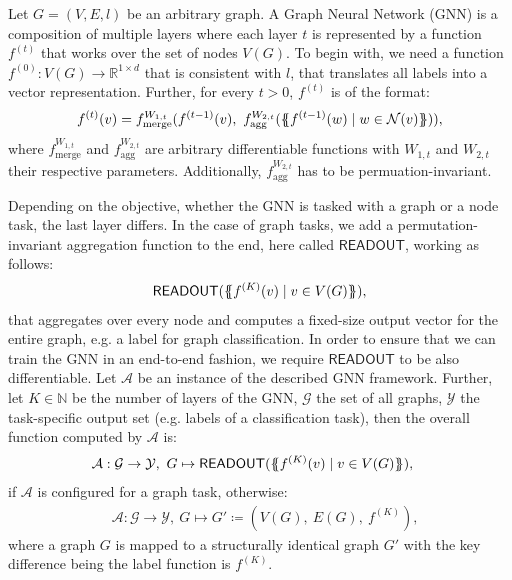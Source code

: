 \begin{definition}\label{def:gnn}
    Let $G = (V, E, l)$ be an arbitrary graph. A Graph Neural Network (GNN) is a composition of multiple layers where each layer $t$ is represented by a function $f^{(t)}$ that works over the set of nodes $V(G)$. To begin with, we need a function $f^{(0)}: V(G) \rightarrow \mathbb{R}^{1 \times d}$ that is consistent with $l$, that translates all labels into a vector representation. Further, for every $t > 0$, $f^{(t)}$ is of the format:
    \begin{align*}
    f^{(t)}(v) = f^{W_{1,t}}_{\text{merge}} (f^{(t-1)}(v), \  f^{W_{2,t}}_{\text{agg}}( \{\!\!\{ f^{(t-1)}(w) \mid w \in \mathcal{N}(v) \}\!\!\} )),
    \end{align*}
    where $f^{W_{1,t}}_{\text{merge}}$ and $f^{W_{2,t}}_{\text{agg}}$ are arbitrary differentiable functions with $W_{1,t}$ and $W_{2,t}$ their respective parameters. Additionally, $f^{W_{2,t}}_{\text{agg}}$ has to be permuation-invariant.

    Depending on the objective, whether the GNN is tasked with a graph or a node task, the last layer differs. In the case of graph tasks, we add a permutation-invariant aggregation function to the end, here called $\textsf{READOUT}$, working as follows:
    \begin{align*}
        \textsf{READOUT}(\{\!\!\{ f^{(K)}(v) \mid v \in V(G) \}\!\!\}),
    \end{align*}
    that aggregates over every node and computes a fixed-size output vector for the entire graph, e.g. a label for graph classification. In order to ensure that we can train the GNN in an end-to-end fashion, we require $\textsf{READOUT}$ to be also differentiable. Let $\mathcal{A}$ be an instance of the described GNN framework. Further, let $K \in \mathbb{N}$ be the number of layers of the GNN, $\mathcal{G}$ the set of all graphs, $\mathcal{Y}$ the task-specific output set (e.g. labels of a classification task), then the overall function computed by $\mathcal{A}$ is:
    \begin{align*}
        &\mathcal{A}: \mathcal{G} \rightarrow \mathcal{Y}, \ G \mapsto \textsf{READOUT}(\{\!\!\{ f^{(K)}(v) \mid v \in V(G) \}\!\!\}),
    \end{align*}
    if $\mathcal{A}$ is configured for a graph task, otherwise:
    \begin{align*}
        &\mathcal{A}: \mathcal{G} \rightarrow \mathcal{Y}, \ G \mapsto G' \coloneqq (V(G), \ E(G), \ f^{(K)}),
    \end{align*}
    where a graph $G$ is mapped to a structurally identical graph $G'$ with the key difference being the label function is $f^{(K)}$.
\end{definition}


